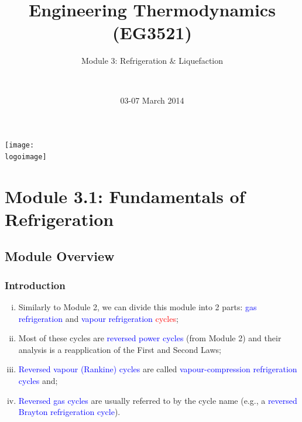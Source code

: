\documentclass[10pt,compress]{beamer}
\institute{School of Engineering}
\title{Engineering Thermodynamics (EG3521)}
\subtitle{Module 3: Refrigeration $\&$ Liquefaction}
\date[03-07/03/2014]{03-07 March 2014}
\author[\shortname]{%
  \fullname\\\ttfamily{\emailaddress}
}
\newcommand{\logoimage}{../FigBanner/UoAHorizBanner}
\begin{document}
\begin{frame}
  \titlepage
  \vfill%
  \begin{center}
    \texttt{[image: \\logoimage]}
  \end{center}
\end{frame}




\section{Module 3.1: Fundamentals of Refrigeration}


\subsection{Module Overview}
\begin{frame}
 \frametitle{Introduction}
  \begin{enumerate}[(i)]
   \item <1-> Similarly to Module 2, we can divide this module into 2 parts: \textcolor{blue}{gas refrigeration} and \textcolor{blue}{vapour refrigeration} \textcolor{red}{cycles};
   \item <2-> Most of these cycles are \textcolor{blue}{reversed power cycles} (from Module 2) and their analysis is a reapplication of the First and Second Laws;%
   \item <3-> \textcolor{blue}{Reversed vapour (Rankine) cycles} are called \textcolor{blue}{vapour-compression refrigeration cycles} and;
   \item <4-> \textcolor{blue}{Reversed gas cycles} are usually referred to by the cycle name (e.g., a \textcolor{blue}{reversed Brayton refrigeration cycle}).
  \end{enumerate}
\end{frame}
\end{document}
